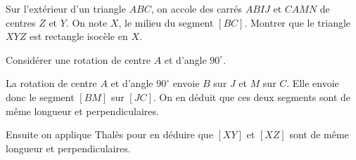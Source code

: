 \begin{exo}%
Sur l'extérieur d'un triangle $ABC$, on accole des carrés $ABIJ$ et $CAMN$ de centres $Z$ et $Y$.
On note $X$, le milieu du segment $[BC]$.
Montrer que le triangle $XYZ$ est rectangle isocèle en $X$.
\begin{center}
\end{center}
\begin{hint}
Considérer une rotation de centre $A$ et d'angle $90^\circ$.
\end{hint}
\begin{sol}
La rotation de centre $A$ et d'angle $90^\circ$ envoie $B$ sur $J$ et $M$ sur $C$.
Elle envoie donc le segment $[BM]$ sur $[JC]$.
On en déduit que ces deux segments sont de même longueur et perpendiculaires.

Ensuite on applique Thalès pour en déduire que $[XY]$ et $[XZ]$ sont de même longueur et perpendiculaires.
\end{sol}
\end{exo}



